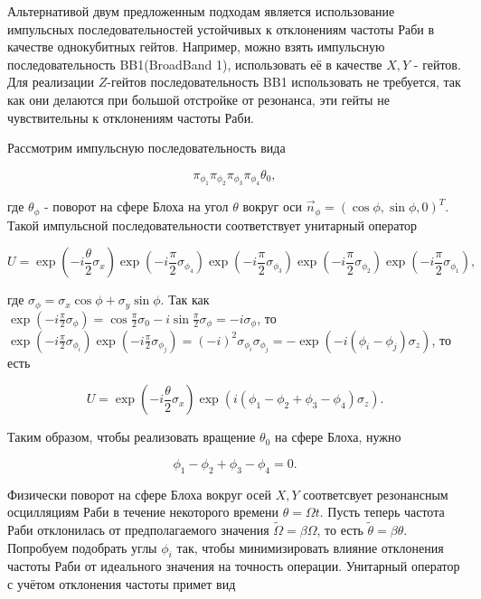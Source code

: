 Альтернативой двум предложенным подходам является использование импульсных последовательностей устойчивых к отклонениям частоты Раби в качестве однокубитных гейтов. Например, можно взять импульсную последовательность BB1(BroadBand 1)\cite{Wimperis1994BroadbandNA,WIMPERIS1989509,WIMPERIS199046}, использовать её в качестве $X, Y$ - гейтов. Для реализации $Z$-гейтов последовательность BB1 использовать не требуется, так как они делаются при большой отстройке от резонанса, эти гейты не чувствительны к отклонениям частоты Раби. 

Рассмотрим импульсную последовательность вида

\begin{equation}
	\pi_{\phi_1} \pi_{\phi_2} \pi_{\phi_3} \pi_{\phi_4} \theta_0,
\end{equation}

где $\theta_\phi$ - поворот на сфере Блоха на угол $\theta$ вокруг оси $\vec{n}_\phi = \left(\cos \phi, \sin \phi, 0 \right)^T$. Такой импульсной последовательности соответствует унитарный оператор 

\begin{equation}
	U = \exp\left( - i \frac{\theta}{2} \sigma_x \right)\exp\left( - i \frac{\pi}{2} \sigma_{\phi_4}\right)\exp\left( - i \frac{\pi}{2} \sigma_{\phi_3}\right)\exp\left( - i \frac{\pi}{2} \sigma_{\phi_2}\right)\exp\left( - i \frac{\pi}{2} \sigma_{\phi_1}\right),
\end{equation}

где $\sigma_\phi = \sigma_x\cos \phi + \sigma_y\sin \phi$. Так как $\exp\left(-i \frac{\pi}{2} \sigma_\phi \right) = \cos \frac{\pi}{2} \sigma_0 - i\sin \frac{\pi}{2} \sigma_\phi = -i\sigma_\phi$, то $\exp\left( - i \frac{\pi}{2} \sigma_{\phi_i}\right)\exp\left( - i \frac{\pi}{2} \sigma_{\phi_j}\right) = (-i)^2 \sigma_{\phi_i} \sigma_{\phi_j} = - \exp\left(-i(\phi_i - \phi_j)\sigma_z \right)$, то есть 

\begin{equation}
	U = \exp\left( - i \frac{\theta}{2} \sigma_x \right)\exp\left( i(\phi_1 - \phi_2 +\phi_3 - \phi_4) \sigma_z\right).
\end{equation} 

Таким образом, чтобы реализовать вращение $\theta_0$ на сфере Блоха, нужно 

\begin{equation}
	\phi_1 - \phi_2 +\phi_3 - \phi_4 = 0.
\end{equation}

Физически поворот на сфере Блоха вокруг осей $X, Y$ соответсвует резонансным осцилляциям Раби в течение некоторого времени $\theta = \Omega t$. Пусть теперь частота Раби отклонилась от предполагаемого значения $\tilde{\Omega} = \beta \Omega$, то есть $\tilde{\theta} = \beta \theta$. Попробуем подобрать углы $\phi_i$ так, чтобы минимизировать влияние отклонения частоты Раби от идеального значения на точность операции. Унитарный оператор с учётом отклонения частоты примет вид


